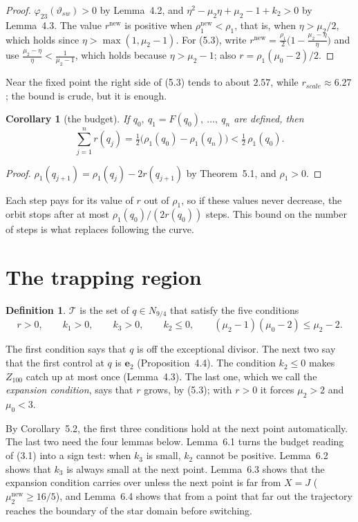 \documentclass[11pt,a4paper]{article}
\theoremstyle{plain}
\newtheorem{corollary}[theorem]{Corollary}
\theoremstyle{definition}
\newtheorem*{definition}{Definition}
\theoremstyle{remark}
\newcommand{\ep}{\mathbf{e}}
\newcommand{\rs}{r_{scale}}
\newcommand{\T}{\mathcal{T}}
\newcommand{\nw}{^{\mathrm{new}}}
\newcommand{\sw}{_{sw}}
\begin{document}
\begin{proof}
$\varphi_{23}(\vartheta\sw)>0$ by Lemma~4.2, and $\eta^2-\mu_2\eta+\mu_2-1+k_2>0$ by Lemma~4.3.
The value $r\nw$ is positive when $\rho_1\nw<\rho_1$, that is, when $\eta>\mu_2/2$, which holds
since $\eta>\max(1,\mu_2-1)$. For (5.3), write
$r\nw=\frac{\rho_1}2\bigl(1-\frac{\mu_2-\eta}{\eta}\bigr)$ and use
$\frac{\mu_2-\eta}{\eta}<\frac1{\mu_2-1}$, which holds because $\eta>\mu_2-1$; also
$r=\rho_1(\mu_0-2)/2$.
\end{proof}

Near the fixed point the right side of (5.3) tends to about $2.57$, while $\rs\approx6.27$; the
bound is crude, but it is enough.

\begin{corollary}[the budget]
If $q_0,\ q_1=F(q_0),\ \dots,\ q_n$ are defined, then
\[
\sum_{j=1}^n r(q_j)=\tfrac12\bigl(\rho_1(q_0)-\rho_1(q_n)\bigr)<\tfrac12\,\rho_1(q_0).
\]
\end{corollary}

\begin{proof}
$\rho_1(q_{j+1})=\rho_1(q_j)-2r(q_{j+1})$ by Theorem~5.1, and $\rho_1>0$.
\end{proof}

Each step pays for its value of $r$ out of $\rho_1$, so if these values never decrease, the
orbit stops after at most $\rho_1(q_0)/(2r(q_0))$ steps. This bound on the number of steps is what
replaces following the curve.

\section{The trapping region}

\begin{definition}
$\T$ is the set of $q\in N_{9/4}$ that satisfy the five conditions
\[
r>0,\qquad k_1>0,\qquad k_3>0,\qquad k_2\le0,\qquad (\mu_2-1)(\mu_0-2)\le\mu_2-2 .
\]
\end{definition}

The first condition says that $q$ is off the exceptional divisor. The next two say that the first
control at $q$ is $\ep_2$ (Proposition~4.4). The condition $k_2\le0$ makes $Z_{100}$ catch up at
most once (Lemma~4.3). The last one, which we call the \emph{expansion condition}, says that $r$
grows, by (5.3); with $r>0$ it forces $\mu_2>2$ and $\mu_0<3$.

By Corollary~5.2, the first three conditions hold at the next point automatically. The last two
need the four lemmas below. Lemma~6.1 turns the budget reading of
(3.1) into a sign test: when $k_3$ is small, $k_2$ cannot be positive. Lemma~6.2 shows that $k_3$
is always small at the next point. Lemma~6.3 shows that the expansion condition carries over
unless the next point is far from $X=J$ ($\mu_2\nw\ge16/5$), and Lemma~6.4 shows that from a point
that far out the trajectory reaches the boundary of the star domain before switching.
\end{document}
